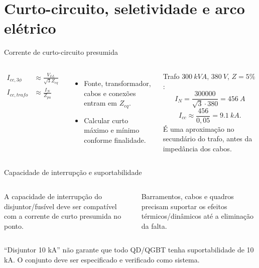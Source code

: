 \section{Curto-circuito, seletividade e arco elétrico}

\begin{frame}{Corrente de curto-circuito presumida}
\small
\begin{columns}[T,onlytextwidth]
\begin{align*}
I_{cc,3\phi}&\approx\frac{V_{LL}}{\sqrt3 Z_{eq}}\\
I_{cc,trafo}&\approx\frac{I_N}{Z_{pu}}
\end{align*}
\begin{itemize}
\item Fonte, transformador, cabos e conexões entram em $Z_{eq}$.
\item Calcular curto máximo e mínimo conforme finalidade.
\end{itemize}
\begin{caixaEx}
Trafo $\SI{300}{kVA}$, $\SI{380}{V}$, $Z=5\%$:
\[
I_N=\frac{300000}{\sqrt3\cdot380}=\SI{456}{A}
\]
\[
I_{cc}\approx\frac{456}{0{,}05}=\SI{9.1}{kA}.
\]
É uma aproximação no secundário do trafo, antes da impedância dos cabos.
\end{caixaEx}
\end{columns}
\end{frame}

\begin{frame}{Capacidade de interrupção e suportabilidade}
\small
\begin{columns}[T,onlytextwidth]
\begin{caixaAt}[title=Dispositivo]
A capacidade de interrupção do disjuntor/fusível deve ser compatível com a corrente de curto presumida no ponto.
\end{caixaAt}
\begin{caixaNorma}[title=Conjunto]
Barramentos, cabos e quadros precisam suportar os efeitos térmicos/dinâmicos até a eliminação da falta.
\end{caixaNorma}
\end{columns}
\vspace{3mm}
\begin{caixaObs}
``Disjuntor 10 kA'' não garante que todo QD/QGBT tenha suportabilidade de 10 kA. O conjunto deve ser especificado e verificado como sistema.
\end{caixaObs}
\end{frame}

